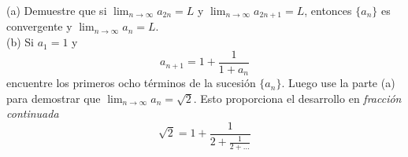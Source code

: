 \item (a) Demuestre que si $\lim_{n \to \infty} a_{2n} = L$ y $\lim_{n \to \infty} a_{2n+1} = L$, entonces $\{a_n\}$ es convergente y $\lim_{n \to \infty} a_n = L$. \\
    (b) Si $a_1 = 1$ y
    \[ a_{n+1} = 1 + \frac{1}{1 + a_n} \]
    encuentre los primeros ocho términos de la sucesión $\{a_n\}$. Luego use la parte (a) para demostrar que $\lim_{n \to \infty} a_n = \sqrt{2}$. Esto proporciona el desarrollo en \textit{fracción continuada}
    \[ \sqrt{2} = 1 + \frac{1}{2 + \frac{1}{2 + \dots}} \]
